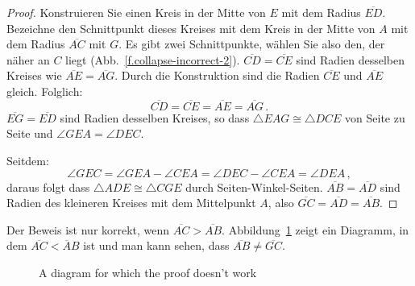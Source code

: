 \begin{proof}
Konstruieren Sie einen Kreis in der Mitte von $E$ mit dem Radius $\overline{ED}$. Bezeichne den Schnittpunkt dieses Kreises mit dem Kreis in der Mitte von $A$ mit dem Radius $\overline{AC}$ mit $G$. Es gibt zwei Schnittpunkte, wählen Sie also den, der näher an $C$ liegt (Abb.~\ref{f.collapse-incorrect-2}).
$\overline{CD}=\overline{CE}$ sind Radien desselben Kreises wie $\overline{AE}=\overline{AG}$. Durch die Konstruktion sind die Radien $\overline{CE}$ und $\overline{AE}$ gleich. Folglich:
\[
\overline{CD} = \overline{CE} = \overline{AE} = \overline{AG}\,.
\]
$\overline{EG} = \overline{ED}$ sind Radien desselben Kreises, so dass $\triangle EAG\cong \triangle DCE$ von Seite zu Seite und $\angle GEA = \angle DEC$.

Seitdem:
\[
\angle GEC = \angle GEA \!-\!\angle CEA = \angle DEC\!-\!\angle CEA = \angle DEA\,,
\]
daraus folgt dass $\triangle ADE\cong\triangle CGE$ durch Seiten-Winkel-Seiten. $\overline{AB}=\overline{AD}$ sind Radien des kleineren Kreises mit dem Mittelpunkt $A$, also $\overline{GC}=\overline{AD}=\overline{AB}$.
\end{proof}

Der Beweis ist nur korrekt, wenn $\overline{AC}>\overline{AB}$.  Abbildung~\ref{f.collapse-incorrect-4} zeigt ein Diagramm, in dem $\overline{AC}<\overline{A}B$ ist und man kann sehen, dass $\overline{AB}\neq\overline{GC}$.

\begin{figure}[b]
\begin{center}
\end{center}
\caption{A diagram for which the proof doesn't work}\label{f.collapse-incorrect-4}
\end{figure}

